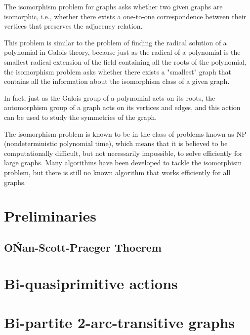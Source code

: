 \documentclass[a4,11pt]{article}
\begin{document}
The isomorphism problem for graphs asks whether two given graphs are isomorphic, i.e., whether there exists a one-to-one correspondence between their vertices that preserves the adjacency relation.

This problem is similar to the problem of finding the radical solution of a polynomial in Galois theory, because just as the radical of a polynomial is the smallest radical extension of the field containing all the roots of the polynomial, the isomorphism problem asks whether there exists a "smallest" graph that contains all the information about the isomorphism class of a given graph.

In fact, just as the Galois group of a polynomial acts on its roots, the automorphism group of a graph acts on its vertices and edges, and this action can be used to study the symmetries of the graph.

The isomorphism problem is known to be in the class of problems known as NP (nondeterministic polynomial time), which means that it is believed to be computationally difficult, but not necessarily impossible, to solve efficiently for large graphs. Many algorithms have been developed to tackle the isomorphism problem, but there is still no known algorithm that works efficiently for all graphs.

\section{Preliminaries}
\subsection{O\'Nan-Scott-Praeger Thoerem}

\section{Bi-quasiprimitive actions}

\section{Bi-partite 2-arc-transitive graphs}
\end{document}
